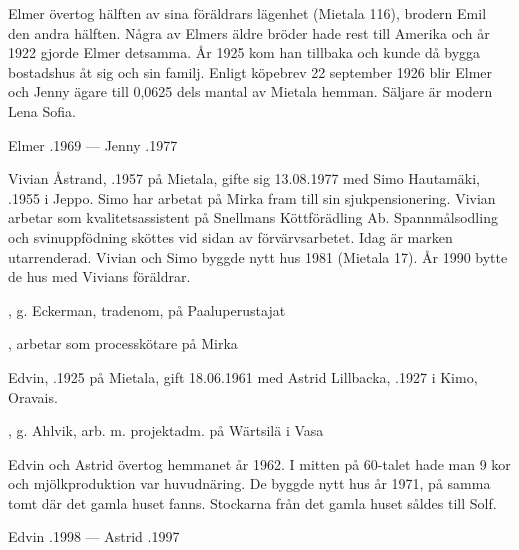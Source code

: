 Elmer övertog hälften av sina föräldrars lägenhet (Mietala 116), brodern Emil den andra hälften. Några av Elmers äldre bröder hade rest till  Amerika och år 1922 gjorde Elmer detsamma. År 1925 kom han tillbaka och kunde då bygga bostadshus åt sig och sin familj. Enligt köpebrev 22 september 1926 blir Elmer och Jenny ägare till 0,0625 dels mantal av Mietala hemman. Säljare är modern Lena Sofia.

Elmer .1969  ---  Jenny .1977






Vivian Åstrand, .1957 på Mietala, gifte sig 13.08.1977 med Simo Hautamäki, .1955 i Jeppo. Simo har arbetat på Mirka fram till sin sjukpensionering. Vivian arbetar som kvalitetsassistent på Snellmans Köttförädling Ab. Spannmålsodling och  svinuppfödning sköttes vid sidan av förvärvsarbetet. Idag är marken utarrenderad. Vivian och Simo byggde nytt hus 1981 (Mietala 17). År 1990 bytte de hus med Vivians föräldrar.
\begin{jhchildren}
  \item {}, g. Eckerman, tradenom, på Paaluperustajat
  \item {}, arbetar som processkötare på Mirka
\end{jhchildren}


Edvin, .1925 på Mietala, gift  18.06.1961 med Astrid Lillbacka, .1927 i Kimo, Oravais.
\begin{jhchildren}
  \item {}
  \item {}, g. Ahlvik, arb. m. projektadm. på Wärtsilä i Vasa
\end{jhchildren}

Edvin och Astrid övertog hemmanet år 1962. I mitten på 60-talet hade man 9 kor och mjölkproduktion var huvudnäring. De  byggde nytt hus år 1971, på samma tomt där det gamla huset fanns. Stockarna från det gamla huset såldes till Solf.

Edvin .1998  ---  Astrid .1997


